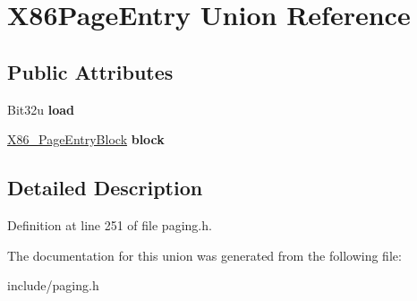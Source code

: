 \hypertarget{unionX86PageEntry}{\section{X86\-Page\-Entry Union Reference}
\label{unionX86PageEntry}
}
\subsection*{Public Attributes}
\begin{DoxyCompactItemize}
\item 
\hypertarget{unionX86PageEntry_aa152f3141962481fe4bf26569e38a6ba}{Bit32u {\bfseries load}}\label{unionX86PageEntry_aa152f3141962481fe4bf26569e38a6ba}

\item 
\hypertarget{unionX86PageEntry_ae559f83e44673e73569cd20584ee609c}{\hyperlink{structX86__PageEntryBlock}{X86\-\_\-\-Page\-Entry\-Block} {\bfseries block}}\label{unionX86PageEntry_ae559f83e44673e73569cd20584ee609c}

\end{DoxyCompactItemize}


\subsection{Detailed Description}


Definition at line 251 of file paging.\-h.



The documentation for this union was generated from the following file\-:\begin{DoxyCompactItemize}
\item 
include/paging.\-h\end{DoxyCompactItemize}
